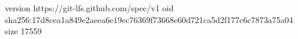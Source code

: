 version https://git-lfs.github.com/spec/v1
oid sha256:17d8cea1a849e2aeea6e19ec76369f73668e60d721ca5d2f177c6c7873a75a04
size 17559

